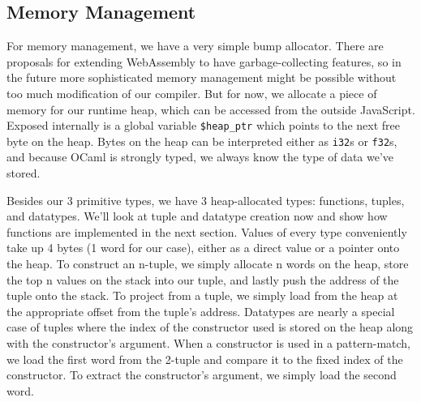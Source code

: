 \documentclass[12pt,a4paper,twoside,openright]{report}
\begin{document}
\subsection{Memory Management}
For memory management, we have a very simple bump allocator.
There are proposals for extending WebAssembly to have garbage-collecting features, so in the future more sophisticated memory management might be possible without too much modification of our compiler.
But for now, we allocate a piece of memory for our runtime heap, which can be accessed from the outside JavaScript.
Exposed internally is a global variable {\tt \$heap\_ptr} which points to the next free byte on the heap.
Bytes on the heap can be interpreted either as {\tt i32}s or {\tt f32}s, and because OCaml is strongly typed, we always know the type of data we've stored.

Besides our 3 primitive types, we have 3 heap-allocated types: functions, tuples, and datatypes.
We'll look at tuple and datatype creation now and show how functions are implemented in the next section.
Values of every type conveniently take up 4 bytes (1 word for our case), either as a direct value or a pointer onto the heap.
To construct an n-tuple, we simply allocate n words on the heap, store the top n values on the stack into our tuple, and lastly push the address of the tuple onto the stack.
To project from a tuple, we simply load from the heap at the appropriate offset from the tuple's address.
Datatypes are nearly a special case of tuples where the index of the constructor used is stored on the heap along with the constructor's argument.
When a constructor is used in a pattern-match, we load the first word from the 2-tuple and compare it to the fixed index of the constructor.
To extract the constructor's argument, we simply load the second word.
\end{document}
